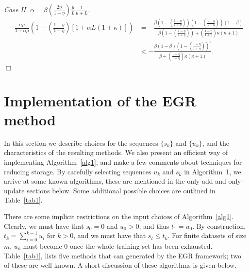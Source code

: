 \documentclass[11pt]{article}
\begin{document}
\textit{Case II.} $\alpha = \displaystyle\beta\left(\frac{2 \eta}{1-\eta} \right)\frac{\mu}{L}\frac{1}{\mu+L}$.
\begin{align*}
 -\frac{\alpha\mu}{1+\alpha\mu}\left(1-{\left(\frac{1-\eta}{1+\eta}\right)}[1+\alpha L(1+\kappa)]\right) &= -\frac{\beta(1-{\left(\frac{1-\eta}{1+\eta}\right)})(1-{\left(\frac{1-\eta}{1+\eta}\right)})(1-\beta)}{\beta(1-{\left(\frac{1-\eta}{1+\eta}\right)})+{\left(\frac{1-\eta}{1+\eta}\right)}\kappa(\kappa+1)}\\
 & < -\frac{\beta(1-\beta)(1-{\left(\frac{1-\eta}{1+\eta}\right)})^2}{\beta+{\left(\frac{1-\eta}{1+\eta}\right)}\kappa(\kappa+1)}.
\end{align*} 
\hspace*{\fill}$\Box$\medskip


 \section{Implementation of the EGR method}  \label{implementation}
 

 In this section we describe  choices for the sequences $\{s_k\}$ and $\{u_k\}$, and the characteristics of the resulting methods. We also present an efficient way of implementing Algorithm~\ref{alg1}, and make a few comments about techniques for reducing storage. By carefully selecting sequences $u_k$ and $s_k$ in Algorithm~1, we arrive at some known algorithms, these are mentioned in the only-add and only-update sections below. Some additional possible choices are outlined in Table~\ref{tab1}.

There are some implicit restrictions on the input choices of Algorithm~\ref{alg1}. Clearly, we must have that $s_0=0$ and $u_0>0$, and thus $t_1 = u_0$.  By construction, $t_k = \sum_{i=0}^{k-1} u_i$ for $k>0$, and we must have that $s_t \leq t_k$. For finite datasets of size $m$, $u_k$ must become $0$ once the whole training set has been exhausted.
Table~\ref{tab1},  lists five methods that can generated by the EGR framework; two of these are well known. A short discussion of these algorithms is given below.
\end{document}
